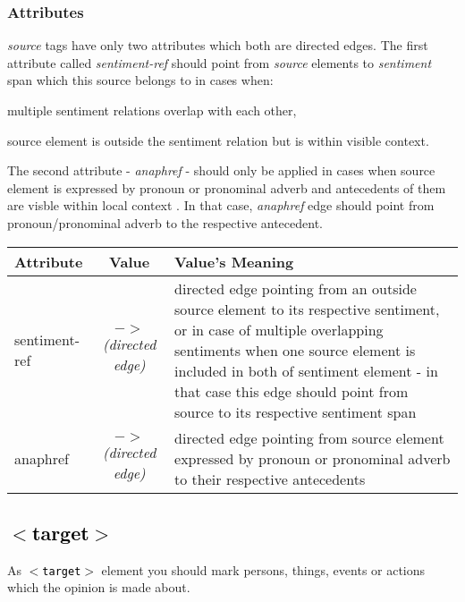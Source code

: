 \documentclass[11pt,a4paper]{article}
\newcommand{\xmltag}[1]{\textcolor{black}{{\small$<$#1$>$}}}
\begin{document}
\subsubsection{Attributes}\label{src-attrs}
\textit{source} tags have only two attributes which both are directed
edges. The first attribute called \textit{sentiment-ref} should point
from \textit{source} elements to \textit{sentiment} span which this
source belongs to in cases when:
\begin{inparaenum}
\item multiple sentiment relations overlap with each other,
\item source element is outside the sentiment relation but is within
  visible context.
\end{inparaenum}
The second attribute - \textit{anaphref} - should only be applied in
cases when source element is expressed by pronoun or pronominal adverb
and antecedents of them are visble within local context . In that
case, \textit{anaphref} edge should point from pronoun/pronominal
adverb to the respective antecedent.

\begin{tabular}{|l|c|p{}|}\hline
  Attribute & Value & Value's Meaning\\\hline

  sentiment-ref & \textit{$->$\newline(directed edge)} & directed edge
  pointing from an outside source element to its respective sentiment,
  or in case of multiple overlapping sentiments when one source
  element is included in both of sentiment element - in that case this
  edge should point from source to its respective sentiment span\\\hline

  anaphref & \textit{$->$\newline(directed edge)} & directed edge
  pointing from source element expressed by pronoun or pronominal
  adverb to their respective antecedents\\\hline
\end{tabular}


\subsection{\xmltag{target}}
As \texttt{\xmltag{target}} element you should mark persons, things,
events or actions which the opinion is made about.
\end{document}
